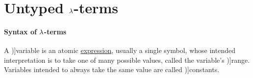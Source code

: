 \section{Untyped \texorpdfstring{\( {\mathrm \lambda} \)}{λ}-terms}\label{sec:untyped_lambda_terms}

\paragraph{Syntax of \( {\mathrm \lambda} \)-terms}

\begin{concept}\label{con:variable}
  A \term[en=variable (\cite[9]{Church1956LogicVol1})]{variable} is an atomic \hyperref[con:expression]{expression}, usually a single symbol, whose intended interpretation is to take one of many possible values, called the variable's \term[en=range (\cite[9]{Church1956LogicVol1})]{range}. Variables intended to always take the same value are called \term[en=constant (\cite[9]{Church1956LogicVol1})]{constants}.
\end{concept}

